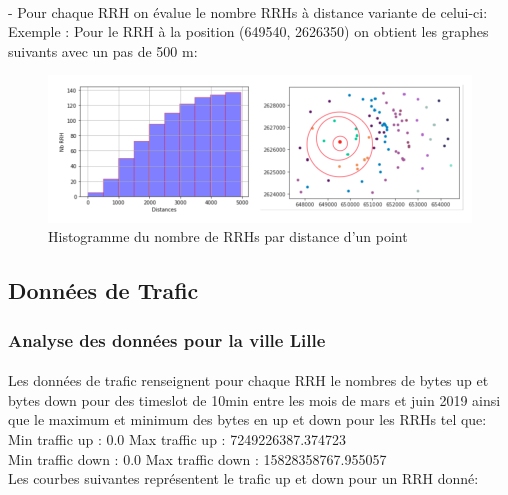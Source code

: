 \documentclass{report}
\begin{document}
\paragraph{}
- Pour chaque RRH on évalue le nombre RRHs à distance variante de celui-ci:\\
Exemple : Pour le RRH à la position (649540, 2626350) on obtient les graphes suivants avec un pas de 500 m:\\
\begin{figure}[H]
  \centering
  \includegraphics[scale=0.6]{images/histogramme_rrh_dist.png}
  \caption{Histogramme du nombre de RRHs par distance d'un point}   
  \label{fig:picture}
\end{figure}
\subsection{Données de Trafic}
\subsubsection{Analyse des données pour la ville Lille}
\paragraph{}
Les données de trafic renseignent pour chaque RRH le nombres de bytes up et bytes down pour des timeslot de 10min entre les mois de mars et juin 2019 ainsi que le maximum et minimum des bytes en up et down pour les RRHs tel que:\\
Min traffic up :  0.0  Max traffic up :  7249226387.374723\\
Min traffic down :  0.0  Max traffic down :  15828358767.955057\\
Les courbes suivantes représentent le trafic up et down pour un RRH donné:\\
\end{document}
